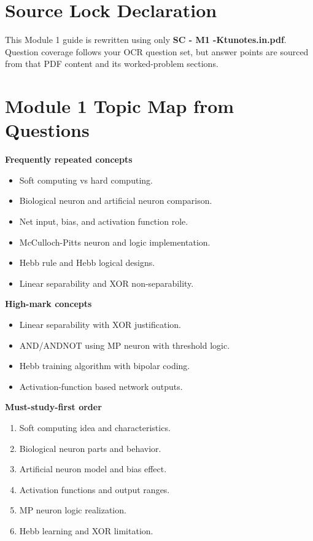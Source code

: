 \documentclass[11pt,a4paper]{article}
\begin{document}
\section*{Source Lock Declaration}
This Module 1 guide is rewritten using only \textbf{SC - M1 -Ktunotes.in.pdf}. Question coverage follows your OCR question set, but answer points are sourced from that PDF content and its worked-problem sections.

\section*{Module 1 Topic Map from Questions}
\textbf{Frequently repeated concepts}
\begin{itemize}
\item Soft computing vs hard computing.
\item Biological neuron and artificial neuron comparison.
\item Net input, bias, and activation function role.
\item McCulloch-Pitts neuron and logic implementation.
\item Hebb rule and Hebb logical designs.
\item Linear separability and XOR non-separability.
\end{itemize}

\textbf{High-mark concepts}
\begin{itemize}
\item Linear separability with XOR justification.
\item AND/ANDNOT using MP neuron with threshold logic.
\item Hebb training algorithm with bipolar coding.
\item Activation-function based network outputs.
\end{itemize}

\textbf{Must-study-first order}
\begin{enumerate}
\item Soft computing idea and characteristics.
\item Biological neuron parts and behavior.
\item Artificial neuron model and bias effect.
\item Activation functions and output ranges.
\item MP neuron logic realization.
\item Hebb learning and XOR limitation.
\end{enumerate}
\end{document}
